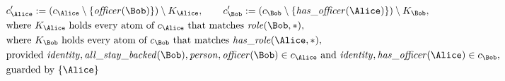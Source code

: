 \begin{align*}
&
c'_
{
\Alice
}
 := 
(c_
{
\Alice
}
 \setminus 
\{
\mathit{\detokenize{
officer
}}
(
\Bob
)
\}
) \setminus K_
{
\Alice
}
, \qquad 
c'_
{
\Bob
}
 := 
(c_
{
\Bob
}
 \setminus 
\{
\mathit{\detokenize{
has_officer
}}
(
\Alice
)
\}
) \setminus K_
{
\Bob
}
,\\
&
\text{where } K_
{
\Alice
}
 \text{ holds every atom of } c_
{
\Alice
}
 \text{ that matches } 
\mathit{\detokenize{
role
}}
(
\Bob
,
\ast
)
,\\
&
\text{where } K_
{
\Bob
}
 \text{ holds every atom of } c_
{
\Bob
}
 \text{ that matches } 
\mathit{\detokenize{
has_role
}}
(
\Alice
,
\ast
)
,\\
&
\text{provided } 
\mathit{\detokenize{
identity
}}
,
\mathit{\detokenize{
all_stay_backed
}}
(
\Bob
)
,
\mathit{\detokenize{
person
}}
,
\mathit{\detokenize{
officer
}}
(
\Bob
)
 \in c_
{
\Alice
}
 \text{ and } 
\mathit{\detokenize{
identity
}}
,
\mathit{\detokenize{
has_officer
}}
(
\Alice
)
 \in c_
{
\Bob
}
,\\
&
\text{guarded by } \{
\Alice
\}
\end{align*}

